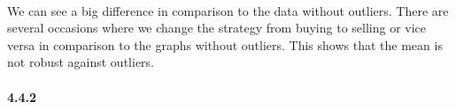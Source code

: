 \documentclass[11pt]{article}
\begin{document}
    \begin{center}
    \end{center}
    { \hspace*{\fill} \\}
    
    We can see a big difference in comparison to the data without outliers.
There are several occasions where we change the strategy from buying to
selling or vice versa in comparison to the graphs without outliers. This
shows that the mean is not robust against outliers.

    \hypertarget{section}{%
\paragraph{4.4.2}\label{section}}
\end{document}
